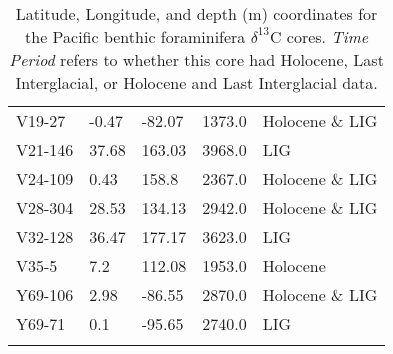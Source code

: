 \begin{longtable}{lllrl}
     V19-27 &    -0.47 &    -82.07 &     1373.0 &  Holocene \& LIG \\
    V21-146 &    37.68 &    163.03 &     3968.0 &             LIG \\
    V24-109 &     0.43 &     158.8 &     2367.0 &  Holocene \& LIG \\
    V28-304 &    28.53 &    134.13 &     2942.0 &  Holocene \& LIG \\
    V32-128 &    36.47 &    177.17 &     3623.0 &             LIG \\
      V35-5 &      7.2 &    112.08 &     1953.0 &        Holocene \\
    Y69-106 &     2.98 &    -86.55 &     2870.0 &  Holocene \& LIG \\
     Y69-71 &      0.1 &    -95.65 &     2740.0 &             LIG \\
\caption{Latitude, Longitude, and depth (m) coordinates for the Pacific benthic foraminifera $\delta^{13}$C cores. \textit{Time Period} refers to whether this core had Holocene, Last Interglacial, or Holocene and Last Interglacial data.}\end{longtable}
